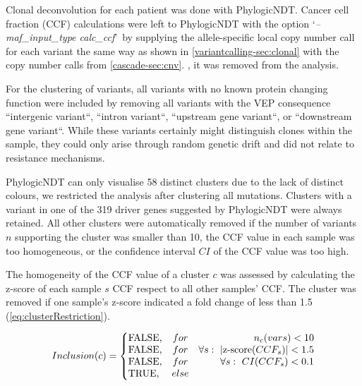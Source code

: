 Clonal deconvolution for each patient was done with PhylogicNDT. Cancer cell fraction (CCF) calculations were left to PhylogicNDT with the option \lq\emph{--maf\_input\_type calc\_ccf}\rq\ by supplying the allele-specific local copy number call for each variant the same way as shown in \autoref{variantcalling-sec:clonal} with the copy number calls from \autoref{cascade-sec:cnv}. , it was removed from the analysis.

For the clustering of variants, all variants with no known protein changing function were included by removing all variants with the VEP consequence ``intergenic variant``, ``intron variant``, ``upstream gene variant``, or ``downstream gene variant``. While these variants certainly might distinguish clones within the sample, they could only arise through random genetic drift and did not relate to resistance mechanisms. 

PhylogicNDT can only visualise 58 distinct clusters due to the lack of distinct colours,  we restricted the analysis after clustering all mutations. Clusters with a variant in one of the 319 driver genes suggested by PhylogicNDT were always retained. All other clusters were automatically removed if the number of variants $n$ supporting the cluster was smaller than 10, the CCF value in each sample was too homogeneous, or the confidence interval $CI$ of the CCF value was too high.

The homogeneity of the CCF value of a cluster $c$ was assessed by calculating the z-score of each sample $s$ CCF  respect to all other samples' CCF. The cluster was removed if one sample’s z-score indicated a fold change of less than 1.5 (\autoref{eq:clusterRestriction}).

\begin{equation}
Inclusion(c) = 
	\left\{ 
	\begin{array}{@{}lcr@{}}
		\text{FALSE,} & for & n_c(vars) < 10 \\
	 	\text{FALSE,} & for & \forall s:\ | \text{z-score}(CCF_s) | < 1.5 \\
		\text{FALSE,} & for &\forall s:\ CI(CCF_s) < 0.1 \\
		\text{TRUE,} & else &\\
\end{array} \right. 
\label{eq:clusterRestriction}
\end{equation}
\myequation[\ref{eq:clusterRestriction}]{Inclusion criteria for cluster of PhylogicNDT analysis}

